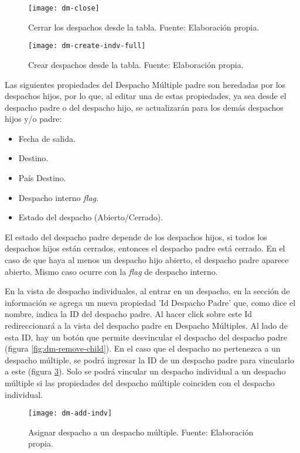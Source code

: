 \begin{figure}[H]
	\centering
	\texttt{[image: dm-close]}
	\caption{\label{fig:dm-close} Cerrar los despachos desde la tabla. Fuente: Elaboración propia.}
\end{figure}

\begin{figure}[H]
	\centering
	\texttt{[image: dm-create-indv-full]}
	\caption{\label{fig:dm-create-indv-full} Crear despachos desde la tabla. Fuente: Elaboración propia.}
\end{figure}

Las siguientes propiedades del Despacho Múltiple padre son heredadas por los despachos hijos, por lo que, al editar una de estas propiedades, ya sea desde el despacho padre o del despacho hijo, se actualizarán para los demás despachos hijos y/o padre:
\begin{itemize}
    \item Fecha de salida.
    \item Destino.
    \item País Destino.    
    \item Despacho interno \textit{flag}.    
    \item Estado del despacho (Abierto/Cerrado).
\end{itemize}

El estado del despacho padre depende de los despachos hijos, si todos los despachos hijos están cerrados, entonces el despacho padre está cerrado. En el caso de que haya al menos un despacho hijo abierto, el despacho padre aparece abierto. Mismo caso ocurre con la \textit{flag} de despacho interno.

En la vista de despacho individuales, al entrar en un despacho, en la sección de información se agrega un nueva propiedad 'Id Despacho Padre' que, como dice el nombre, indica la ID del despacho padre. Al hacer click sobre este Id redireccionará a la vista del despacho padre en Despacho Múltiples.
Al lado de esta ID, hay un botón que permite desvincular el despacho del despacho padre (figura \ref{fig:dm-remove-child}). 
En el caso que el despacho no pertenezca a un despacho múltiple, se podrá ingresar la ID de un despacho padre para vincularlo a este (figura \ref{fig:dm-add-indv}). Solo se podrá vincular un despacho individual a un despacho múltiple si las propiedades del despacho múltiple coinciden con el despacho individual.

\begin{figure}[H]
	\centering
	\texttt{[image: dm-add-indv]}
	\caption{\label{fig:dm-add-indv} Asignar despacho a un despacho múltiple. Fuente: Elaboración propia.}
\end{figure}

